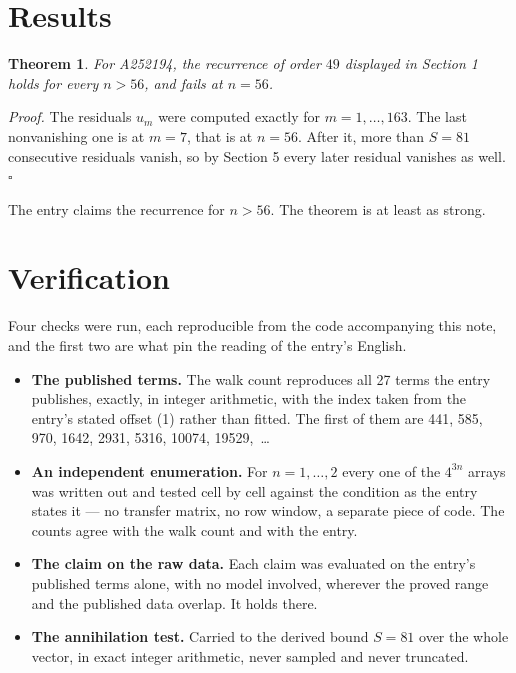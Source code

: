 \documentclass[11pt]{article}
\newtheorem{theorem}{Theorem}
\theoremstyle{definition}
\begin{document}
\section{Results}

\begin{theorem} For A252194, the recurrence of order $49$ displayed in Section 1 holds for every $n > 56$, and fails at $n = 56$.\end{theorem}

{\itshape Proof.} The residuals $u_m$ were computed exactly for $m = 1,\dots,163$. The last nonvanishing one is at $m = 7$, that is at $n = 56$. After it, more than $S = 81$ consecutive residuals vanish, so by Section 5 every later residual vanishes as well. $\square$

The entry claims the recurrence for $n > 56$. The theorem is at least as strong.

\section{Verification}

Four checks were run, each reproducible from the code accompanying this note, and the first two are what pin the reading of the entry's English.

\begin{itemize}

\item {\bfseries The published terms.} The walk count reproduces all 27 terms the entry publishes, exactly, in integer arithmetic, with the index taken from the entry's stated offset (1) rather than fitted. The first of them are 441, 585, 970, 1642, 2931, 5316, 10074, 19529,~\dots

\item {\bfseries An independent enumeration.} For $n = 1,\dots,2$ every one of the $4^{3n}$ arrays was written out and tested cell by cell against the condition as the entry states it --- no transfer matrix, no row window, a separate piece of code. The counts agree with the walk count and with the entry.

\item {\bfseries The claim on the raw data.} Each claim was evaluated on the entry's published terms alone, with no model involved, wherever the proved range and the published data overlap. It holds there.

\item {\bfseries The annihilation test.} Carried to the derived bound $S = 81$ over the whole vector, in exact integer arithmetic, never sampled and never truncated.

\end{itemize}
\end{document}
